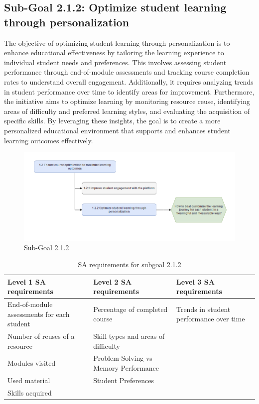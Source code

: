 \newpage
\subsection{Sub-Goal 2.1.2: Optimize student learning through personalization}
The objective of optimizing student learning through personalization is to enhance educational effectiveness by tailoring the learning experience to individual student needs and preferences. This involves assessing student performance through end-of-module assessments and tracking course completion rates to understand overall engagement. Additionally, it requires analyzing trends in student performance over time to identify areas for improvement. Furthermore, the initiative aims to optimize learning by monitoring resource reuse, identifying areas of difficulty and preferred learning styles, and evaluating the acquisition of specific skills. By leveraging these insights, the goal is to create a more personalized educational environment that supports and enhances student learning outcomes effectively.
\begin{figure}[H]
    \centering
    \includegraphics[width=\textwidth]{./assets/subgoal_1.2.2.png}
    \caption{Sub-Goal 2.1.2}
    \label{fig:subgoal1.2.2}
\end{figure}

\begin{table}[H]
\begin{center}
\begin{tabular}{ | m{5cm} | m{5cm}| m{5cm} | } 
  \hline
  \textbf{Level 1 SA requirements} & \textbf{Level 2 SA requirements}  & \textbf{Level 3 SA requirements}  \\ 
  \hline
  End-of-module assessments for each student & Percentage of completed course & Trends in student performance over time \\ 
  \hline
  Number of reuses of a resource & Skill types and areas of difficulty & \\ 
  \hline
  Modules visited & Problem-Solving vs Memory Performance & \\ 
  \hline
  Used material & Student Preferences & \\ 
  \hline
  Skills acquired &  & \\ 
  \hline
\end{tabular}
\end{center}
\caption{SA requirements for subgoal 2.1.2}
\end{table}